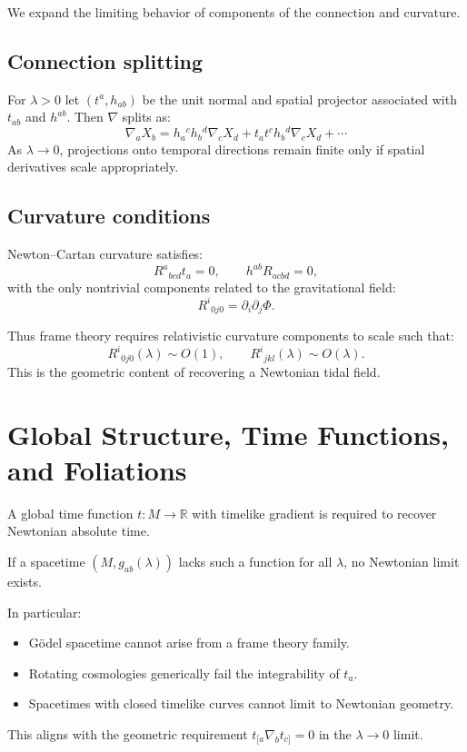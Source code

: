 \documentclass[12pt]{article}
\begin{document}
We expand the limiting behavior of components of the connection and curvature.

\subsection{Connection splitting}

For $\lambda>0$ let $(t^a,h_{ab})$ be the unit normal and spatial projector
associated with $t_{ab}$ and $h^{ab}$.
Then $\nabla$ splits as:
\[
\nabla_a X_b 
 = h_a{}^ch_b{}^d \nabla_c X_d 
 + t_a t^c h_b{}^d \nabla_c X_d
 + \cdots
\]
As $\lambda\to0$, projections onto temporal directions remain finite only 
if spatial derivatives scale appropriately.

\subsection{Curvature conditions}

Newton--Cartan curvature satisfies:
\[
R^a{}_{bcd}t_a = 0, \qquad 
h^{ab}R_{acbd}=0,
\]
with the only nontrivial components related to the gravitational field:
\[
R^i{}_{0j0} = \partial_i\partial_j\Phi.
\]

Thus frame theory requires relativistic curvature components to scale such that:
\[
R^i{}_{0j0}(\lambda) \sim O(1), 
\qquad 
R^i{}_{jkl}(\lambda) \sim O(\lambda).
\]
This is the geometric content of recovering a Newtonian tidal field.


\section{Global Structure, Time Functions, and Foliations}

A global time function $t:M\to\mathbb{R}$ with timelike gradient is required 
to recover Newtonian absolute time.

If a spacetime $(M,g_{ab}(\lambda))$ lacks such a function for all $\lambda$, 
no Newtonian limit exists.

In particular:
\begin{itemize}
\item Gödel spacetime cannot arise from a frame theory family.
\item Rotating cosmologies generically fail the integrability of $t_a$.
\item Spacetimes with closed timelike curves cannot limit to Newtonian geometry.
\end{itemize}

This aligns with the geometric requirement $t_{[a}\nabla_b t_{c]}=0$ 
in the $\lambda\to0$ limit.
\end{document}
